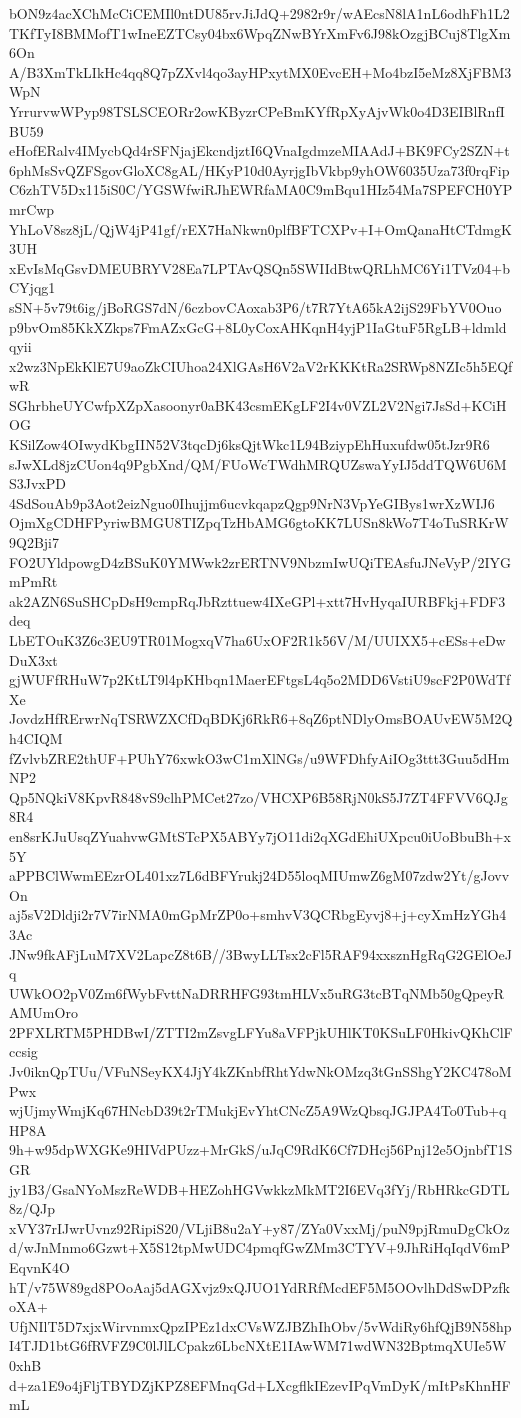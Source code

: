 bON9z4acXChMcCiCEMIl0ntDU85rvJiJdQ+2982r9r/wAEcsN8lA1nL6odhFh1L2
TKfTyI8BMMofT1wIneEZTCsy04bx6WpqZNwBYrXmFv6J98kOzgjBCuj8TlgXm6On
A/B3XmTkLIkHc4qq8Q7pZXvl4qo3ayHPxytMX0EvcEH+Mo4bzI5eMz8XjFBM3WpN
YrrurvwWPyp98TSLSCEORr2owKByzrCPeBmKYfRpXyAjvWk0o4D3EIBlRnfIBU59
eHofERalv4IMycbQd4rSFNjajEkcndjztI6QVnaIgdmzeMIAAdJ+BK9FCy2SZN+t
6phMsSvQZFSgovGloXC8gAL/HKyP10d0AyrjgIbVkbp9yhOW6035Uza73f0rqFip
C6zhTV5Dx115iS0C/YGSWfwiRJhEWRfaMA0C9mBqu1HIz54Ma7SPEFCH0YPmrCwp
YhLoV8sz8jL/QjW4jP41gf/rEX7HaNkwn0plfBFTCXPv+I+OmQanaHtCTdmgK3UH
xEvIsMqGsvDMEUBRYV28Ea7LPTAvQSQn5SWIIdBtwQRLhMC6Yi1TVz04+bCYjqg1
sSN+5v79t6ig/jBoRGS7dN/6czbovCAoxab3P6/t7R7YtA65kA2ijS29FbYV0Ouo
p9bvOm85KkXZkps7FmAZxGcG+8L0yCoxAHKqnH4yjP1IaGtuF5RgLB+ldmldqyii
x2wz3NpEkKlE7U9aoZkCIUhoa24XlGAsH6V2aV2rKKKtRa2SRWp8NZIc5h5EQfwR
SGhrbheUYCwfpXZpXasoonyr0aBK43csmEKgLF2I4v0VZL2V2Ngi7JsSd+KCiHOG
KSilZow4OIwydKbgIIN52V3tqcDj6ksQjtWkc1L94BziypEhHuxufdw05tJzr9R6
sJwXLd8jzCUon4q9PgbXnd/QM/FUoWcTWdhMRQUZswaYyIJ5ddTQW6U6MS3JvxPD
4SdSouAb9p3Aot2eizNguo0Ihujjm6ucvkqapzQgp9NrN3VpYeGIBys1wrXzWIJ6
OjmXgCDHFPyriwBMGU8TIZpqTzHbAMG6gtoKK7LUSn8kWo7T4oTuSRKrW9Q2Bji7
FO2UYldpowgD4zBSuK0YMWwk2zrERTNV9NbzmIwUQiTEAsfuJNeVyP/2IYGmPmRt
ak2AZN6SuSHCpDsH9cmpRqJbRzttuew4IXeGPl+xtt7HvHyqaIURBFkj+FDF3deq
LbETOuK3Z6c3EU9TR01MogxqV7ha6UxOF2R1k56V/M/UUIXX5+cESs+eDwDuX3xt
gjWUFfRHuW7p2KtLT9l4pKHbqn1MaerEFtgsL4q5o2MDD6VstiU9scF2P0WdTfXe
JovdzHfRErwrNqTSRWZXCfDqBDKj6RkR6+8qZ6ptNDlyOmsBOAUvEW5M2Qh4CIQM
fZvlvbZRE2thUF+PUhY76xwkO3wC1mXlNGs/u9WFDhfyAiIOg3ttt3Guu5dHmNP2
Qp5NQkiV8KpvR848vS9clhPMCet27zo/VHCXP6B58RjN0kS5J7ZT4FFVV6QJg8R4
en8srKJuUsqZYuahvwGMtSTcPX5ABYy7jO11di2qXGdEhiUXpcu0iUoBbuBh+x5Y
aPPBClWwmEEzrOL401xz7L6dBFYrukj24D55loqMIUmwZ6gM07zdw2Yt/gJovvOn
aj5sV2Dldji2r7V7irNMA0mGpMrZP0o+smhvV3QCRbgEyvj8+j+cyXmHzYGh43Ac
JNw9fkAFjLuM7XV2LapcZ8t6B//3BwyLLTsx2cFl5RAF94xxsznHgRqG2GElOeJq
UWkOO2pV0Zm6fWybFvttNaDRRHFG93tmHLVx5uRG3tcBTqNMb50gQpeyRAMUmOro
2PFXLRTM5PHDBwI/ZTTI2mZsvgLFYu8aVFPjkUHlKT0KSuLF0HkivQKhClFccsig
Jv0iknQpTUu/VFuNSeyKX4JjY4kZKnbfRhtYdwNkOMzq3tGnSShgY2KC478oMPwx
wjUjmyWmjKq67HNcbD39t2rTMukjEvYhtCNcZ5A9WzQbsqJGJPA4To0Tub+qHP8A
9h+w95dpWXGKe9HIVdPUzz+MrGkS/uJqC9RdK6Cf7DHcj56Pnj12e5OjnbfT1SGR
jy1B3/GsaNYoMszReWDB+HEZohHGVwkkzMkMT2I6EVq3fYj/RbHRkcGDTL8z/QJp
xVY37rIJwrUvnz92RipiS20/VLjiB8u2aY+y87/ZYa0VxxMj/puN9pjRmuDgCkOz
d/wJnMnmo6Gzwt+X5S12tpMwUDC4pmqfGwZMm3CTYV+9JhRiHqIqdV6mPEqvnK4O
hT/v75W89gd8POoAaj5dAGXvjz9xQJUO1YdRRfMcdEF5M5OOvlhDdSwDPzfkoXA+
UfjNIlT5D7xjxWirvnmxQpzIPEz1dxCVsWZJBZhIhObv/5vWdiRy6hfQjB9N58hp
I4TJD1btG6fRVFZ9C0lJlLCpakz6LbcNXtE1IAwWM71wdWN32BptmqXUIe5W0xhB
d+za1E9o4jFljTBYDZjKPZ8EFMnqGd+LXcgflkIEzevIPqVmDyK/mItPsKhnHFmL
